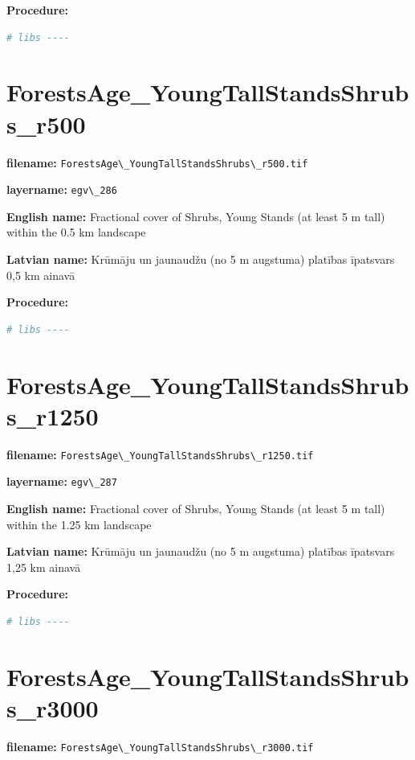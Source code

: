 \documentclass[
]{book}
\newcommand{\passthrough}[1]{#1}
\begin{document}
\textbf{Procedure:}

\begin{lstlisting}[language=R]
# libs ----
\end{lstlisting}

\section{ForestsAge\_YoungTallStandsShrubs\_r500}\label{ch06.286}

\textbf{filename:} \passthrough{\lstinline!ForestsAge\_YoungTallStandsShrubs\_r500.tif!}

\textbf{layername:} \passthrough{\lstinline!egv\_286!}

\textbf{English name:} Fractional cover of Shrubs, Young Stands (at least 5 m tall) within the 0.5 km landscape

\textbf{Latvian name:} Krūmāju un jaunaudžu (no 5 m augstuma) platības īpatsvars 0,5 km ainavā

\textbf{Procedure:}

\begin{lstlisting}[language=R]
# libs ----
\end{lstlisting}

\section{ForestsAge\_YoungTallStandsShrubs\_r1250}\label{ch06.287}

\textbf{filename:} \passthrough{\lstinline!ForestsAge\_YoungTallStandsShrubs\_r1250.tif!}

\textbf{layername:} \passthrough{\lstinline!egv\_287!}

\textbf{English name:} Fractional cover of Shrubs, Young Stands (at least 5 m tall) within the 1.25 km landscape

\textbf{Latvian name:} Krūmāju un jaunaudžu (no 5 m augstuma) platības īpatsvars 1,25 km ainavā

\textbf{Procedure:}

\begin{lstlisting}[language=R]
# libs ----
\end{lstlisting}

\section{ForestsAge\_YoungTallStandsShrubs\_r3000}\label{ch06.288}

\textbf{filename:} \passthrough{\lstinline!ForestsAge\_YoungTallStandsShrubs\_r3000.tif!}
\end{document}
